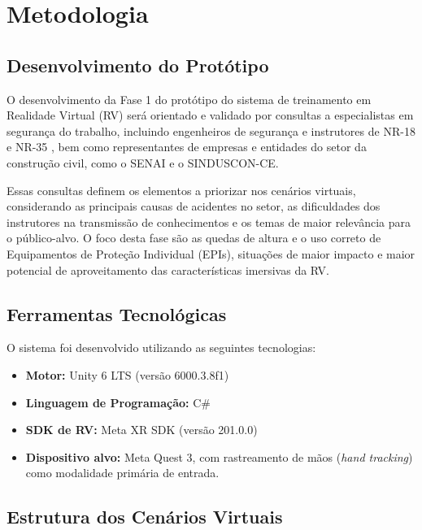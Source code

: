 \chapter{Metodologia}
\label{cap:metodologia}

\section{Desenvolvimento do Protótipo}

O desenvolvimento da Fase 1 do protótipo do sistema de treinamento em Realidade Virtual (RV) será orientado e validado por consultas a especialistas em segurança do trabalho, incluindo engenheiros de segurança e instrutores de NR-18 \cite{brasil2025nr18} e NR-35 \cite{brasil2023nr35}, bem como representantes de empresas e entidades do setor da construção civil, como o \gls{SENAI} e o SINDUSCON-CE.

Essas consultas definem os elementos a priorizar nos cenários virtuais, considerando as principais causas de acidentes no setor, as dificuldades dos instrutores na transmissão de conhecimentos e os temas de maior relevância para o público-alvo. O foco desta fase são as quedas de altura e o uso correto de Equipamentos de Proteção Individual (EPIs), situações de maior impacto e maior potencial de aproveitamento das características imersivas da RV.

\section{Ferramentas Tecnológicas}

O sistema foi desenvolvido utilizando as seguintes tecnologias:

\begin{itemize}
    \item \textbf{Motor:} Unity 6 LTS (versão 6000.3.8f1)
    \item \textbf{Linguagem de Programação:} C\#
    \item \textbf{\gls{SDK} de RV:} Meta XR SDK (versão 201.0.0)
    \item \textbf{Dispositivo alvo:} Meta Quest 3, com rastreamento de mãos (\textit{hand tracking}) como modalidade primária de entrada.
\end{itemize}

\section{Estrutura dos Cenários Virtuais}

